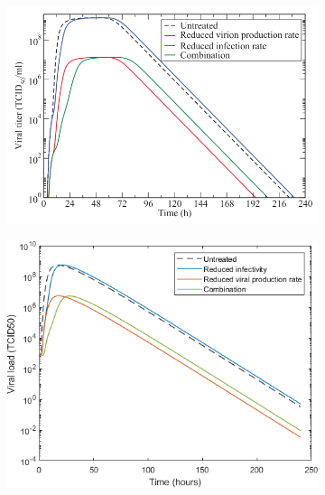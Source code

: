 \documentclass[a4paper,11pt]{article}
\begin{document}
\begin{figure}[ht]
\begin{subfigure}{0.4\textwidth}
    \includegraphics[width=\textwidth]{treatm100.png}
    \end{subfigure}
    \begin{subfigure}{0.35\textwidth}
    
    \includegraphics[width=\textwidth]{treat100.png}
    \end{subfigure}
    
    \begin{subfigure}{0.4\textwidth}
    

\end{subfigure}
\end{figure}
\end{document}
